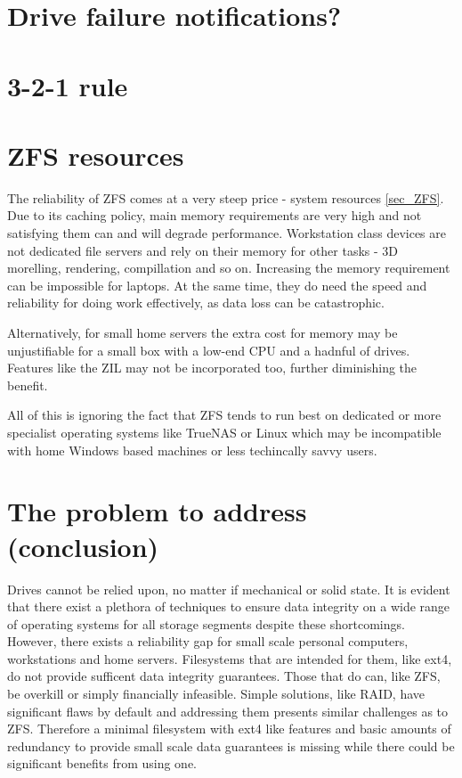     \section{Drive failure notifications?}

    \section{3-2-1 rule}

    \section{ZFS resources}

        The reliability of ZFS comes at a very steep price - system resources
        \ref{sec_ZFS}. Due to its caching policy, main memory requirements are
        very high and not satisfying them can and will degrade performance.
        Workstation class devices are not dedicated file servers and rely on
        their memory for other tasks - 3D morelling, rendering, compillation
        and so on. Increasing the memory requirement can be impossible for
        laptops. At the same time, they do need the speed and reliability for
        doing work effectively, as data loss can be catastrophic.

        Alternatively, for small home servers the extra cost for memory may be
        unjustifiable for a small box with a low-end CPU and a hadnful of
        drives. Features like the ZIL may not be incorporated too, further
        diminishing the benefit.

        All of this is ignoring the fact that ZFS tends to run best on
        dedicated or more specialist operating systems like TrueNAS or Linux
        which may be incompatible with home Windows based machines or less
        techincally savvy users.

    \section{The problem to address (conclusion)}
        \label{sec_problem}

        Drives cannot be relied upon, no matter if mechanical or solid state.
        It is evident that there exist a plethora of techniques to ensure data
        integrity on a wide range of operating systems for all storage segments
        despite these shortcomings. However, there exists a reliability gap for
        small scale personal computers, workstations and home servers.
        Filesystems that are intended for them, like ext4, do not provide
        sufficent data integrity guarantees. Those that do can, like ZFS, be
        overkill or simply financially infeasible. Simple solutions, like RAID,
        have significant flaws by default and addressing them presents similar
        challenges as to ZFS. Therefore a minimal filesystem with ext4 like
        features and basic amounts of redundancy to provide small scale data
        guarantees is missing while there could be significant benefits from
        using one.
